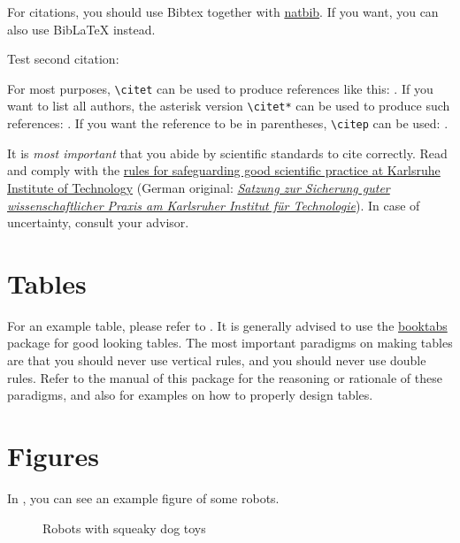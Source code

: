 For citations, you should use Bibtex together with \href{https://www.ctan.org/pkg/natbib}{natbib}.
If you want, you can also use BibLaTeX instead.

Test second citation: \citet{kober2013reinforcement}

For most purposes, \texttt{\textbackslash{}citet} can be used to produce references like this: \citet{deisenroth2013survey}.
If you want to list all authors, the asterisk version \texttt{\textbackslash{}citet*} can be used to produce such references: \citet*{deisenroth2013survey}.
If you want the reference to be in parentheses, \texttt{\textbackslash{}citep} can be used: \citep{deisenroth2013survey}.

It is \emph{most important} that you abide by scientific standards to cite correctly.
Read and comply with the \href{https://www.kit.edu/downloads/gute_wiss_praxis_en.pdf}{rules for safeguarding good scientific practice at Karlsruhe Institute of Technology} (German original:  \href{https://www.sle.kit.edu/downloads/AmtlicheBekanntmachungen/2018_AB_032.pdf}{\textit{Satzung zur Sicherung guter wissenschaftlicher Praxis am Karlsruher Institut für Technologie}}).
In case of uncertainty, consult your advisor.


\section{Tables}

For an example table, please refer to .
It is generally advised to use the \href{https://ctan.org/pkg/booktabs?lang=en}{booktabs} package for good looking tables.
The most important paradigms on making tables are that you should never use vertical rules, and you should never use double rules.
Refer to the manual of this package for the reasoning or rationale of these paradigms, and also for examples on how to properly design tables.


\section{Figures}

In , you can see an example figure of some robots.

\begin{figure}[ht!]
    \centering
    \hspace{1cm}                       
    \caption{Robots with squeaky dog toys}
    \label{fig:example}
\end{figure}

